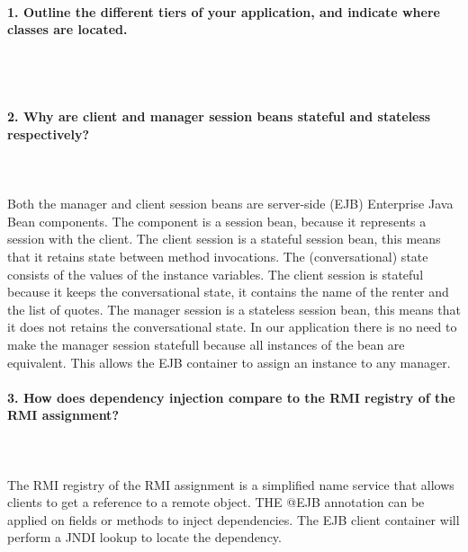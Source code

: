 \documentclass{ds-report}
\begin{document}
	\maketitle

	\paragraph{1. Outline the different tiers of your application, and indicate where classes are located.} \mbox{}\\\\




	
	\paragraph{2. Why are client and manager session beans stateful and stateless respectively?} \mbox{}\\\\
Both the manager and client session beans are server-side (EJB) Enterprise Java Bean components. The component is a session bean, because it represents a session with the client.
The client session is a stateful session bean, this means that it retains state between method invocations. The (conversational) state consists of the values of the instance variables. The client session is stateful because it keeps the conversational state, it contains the name of the renter and the list of quotes.
The manager session is a stateless session bean, this means that it does not retains the conversational state. In our application there is no need to make the manager session statefull because all instances of the bean are equivalent. This allows the EJB container to assign an instance to any manager.



	\paragraph{3. How does dependency injection compare to the RMI registry of the RMI assignment?} \mbox{}\\\\
The RMI registry of the RMI assignment is a simplified name service that allows clients to get a reference to a remote object. THE @EJB annotation can be applied on fields or methods to inject dependencies. The EJB client container will perform a JNDI lookup to locate the dependency.
\end{document}

